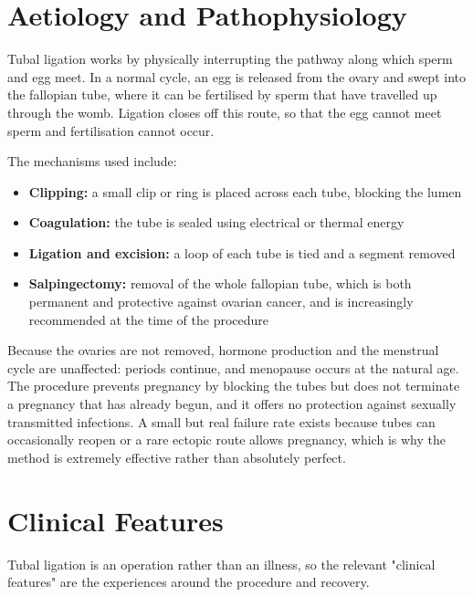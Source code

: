 \section*{Aetiology and Pathophysiology}
Tubal ligation works by physically interrupting the pathway along which sperm and egg meet. In a normal cycle, an egg is released from the ovary and swept into the fallopian tube, where it can be fertilised by sperm that have travelled up through the womb. Ligation closes off this route, so that the egg cannot meet sperm and fertilisation cannot occur.

The mechanisms used include:
\begin{itemize}
    \item \textbf{Clipping:} a small clip or ring is placed across each tube, blocking the lumen
    \item \textbf{Coagulation:} the tube is sealed using electrical or thermal energy
    \item \textbf{Ligation and excision:} a loop of each tube is tied and a segment removed
    \item \textbf{Salpingectomy:} removal of the whole fallopian tube, which is both permanent and protective against ovarian cancer, and is increasingly recommended at the time of the procedure
\end{itemize}

Because the ovaries are not removed, hormone production and the menstrual cycle are unaffected: periods continue, and menopause occurs at the natural age. The procedure prevents pregnancy by blocking the tubes but does not terminate a pregnancy that has already begun, and it offers no protection against sexually transmitted infections. A small but real failure rate exists because tubes can occasionally reopen or a rare ectopic route allows pregnancy, which is why the method is extremely effective rather than absolutely perfect.

\section*{Clinical Features}
Tubal ligation is an operation rather than an illness, so the relevant "clinical features" are the experiences around the procedure and recovery.

